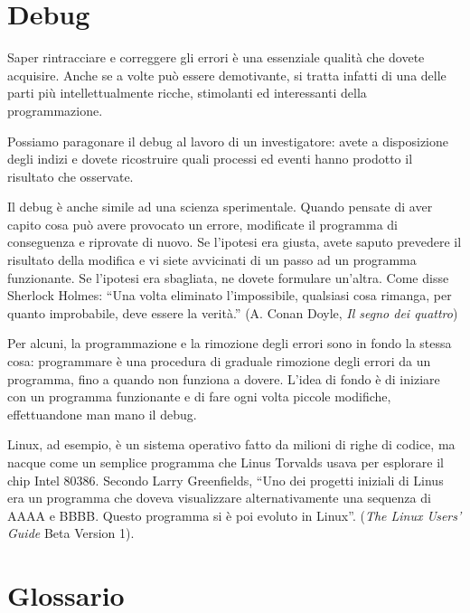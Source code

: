 \documentclass[10pt]{book}
\begin{document}
\section{Debug}
\label{editor}

Saper rintracciare e correggere gli errori è una essenziale qualità che dovete acquisire. Anche se a volte può essere demotivante, si tratta infatti di una delle parti più intellettualmente ricche, stimolanti ed interessanti della programmazione.

Possiamo paragonare il debug al lavoro di un investigatore: avete a disposizione degli indizi e dovete ricostruire quali processi ed eventi hanno prodotto il risultato che osservate.

Il debug è anche simile ad una scienza sperimentale. Quando pensate di aver capito cosa può avere provocato un errore, modificate il programma di conseguenza e riprovate di nuovo. Se l'ipotesi era giusta, avete saputo prevedere il risultato della modifica e vi siete avvicinati di un passo ad un programma funzionante. Se l'ipotesi era sbagliata, ne dovete formulare un'altra. Come disse Sherlock Holmes: ``Una volta eliminato l'impossibile, qualsiasi cosa rimanga, per quanto improbabile, deve essere la verità.''
(A. Conan Doyle, {\em Il segno dei quattro})

Per alcuni, la programmazione e la rimozione degli errori sono in fondo la stessa cosa: programmare è una procedura di graduale rimozione degli errori da un programma, fino a quando non funziona a dovere. L'idea di fondo è di iniziare con un programma funzionante e di fare ogni volta piccole modifiche, effettuandone man mano il debug.

Linux, ad esempio, è un sistema operativo fatto da milioni di righe di codice, ma nacque come un semplice programma che Linus Torvalds usava per esplorare il chip Intel 80386. Secondo Larry Greenfields, ``Uno dei progetti iniziali di Linus era un programma che doveva visualizzare alternativamente una sequenza di AAAA e BBBB. Questo programma si è poi evoluto in Linux''. ({\em The Linux Users' Guide} Beta Version 1).

\section{Glossario}
\end{document}
